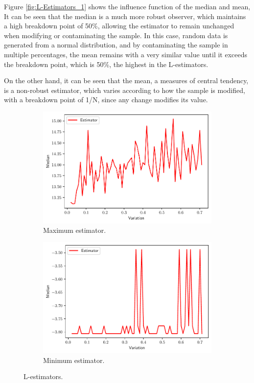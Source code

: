 \documentclass[11pt]{article}
\theoremstyle{definition}
\theoremstyle{remark}
\theoremstyle{remark}
\begin{document}
Figure \ref{fig:L-Estimators_1} shows the influence function of the
median and mean, It can be seen that the median is a much more robust
observer, which maintains a high breakdown point of 50\%, allowing the
estimator to remain unchanged when modifying or contaminating the
sample. In this case, random data is generated from a normal
distribution, and by contaminating the sample in multiple percentages,
the mean remains with a very similar value until it exceeds the
breakdown point, which is 50\%, the highest in the L-estimators.

On the other hand, it can be seen that the mean, a measures of central
tendency, is a non-robust estimator, which varies according to how the
sample is modified, with a breakdown point of 1/N, since any change
modifies its value.

\begin{figure}[H]
  \centering
  \begin{subfigure}[t]{0.475\textwidth}
      \centering
      \includegraphics[scale=0.40]{../figs/max-L.pdf}
      \caption{Maximum estimator.}
  \end{subfigure}
  \begin{subfigure}[t]{0.475\textwidth}
      \centering
      \includegraphics[scale=0.40]{../figs/min-L.pdf}
      \caption{Minimum estimator.}
  \end{subfigure}
  \caption{L-estimators.}
  \label{fig:L-Estimators_2}
\end{figure}
\end{document}
